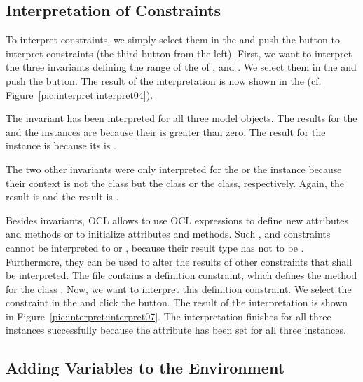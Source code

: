 \subsection{Interpretation of Constraints}

To interpret constraints, we simply select them in the  
and push the button to interpret constraints (the third button from the left). 
First, we want to interpret the three invariants defining the range of the 
 of ,  and . We 
select them in the  and push the 
button. The result of the interpretation is now shown in the  (cf. Figure~\ref{pic:interpret:interpret04}).

The invariant  has been interpreted for all three model
objects. The results for the  and the  instances
are  because their  is greater than zero. The result for
the  instance is  because its  is
.

The two other invariants were only interpreted for the  or the 
 instance because their context is not the class 
 but the  class or the  class, 
respectively. Again, the  result is  and the 
 result is .

Besides invariants, \acs{OCL} allows to use \acs{OCL} expressions to
define new attributes and methods or to initialize attributes and methods. Such
,  and  constraints cannot be interpreted to
 or , because their result type has not to be 
. Furthermore, they can be used to alter the results of other 
constraints that shall be interpreted. The  file 
contains a definition constraint, which defines the method  for 
the class . Now, we want to interpret this definition constraint. 
We select the constraint in the  and click the
 button. The result of the interpretation is shown in 
Figure~\ref{pic:interpret:interpret07}. The interpretation finishes for all
three instances successfully because the attribute  has been set for 
all three instances.


\subsection{Adding Variables to the Environment}

